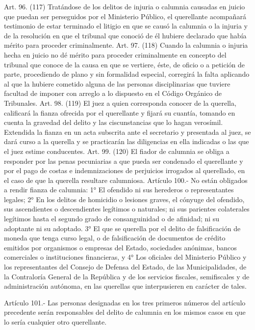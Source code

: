     Art. 96. (117) Tratándose de los delitos de injuria o calumnia causadas en juicio que puedan ser perseguidos por el Ministerio Público, el querellante acompañará testimonio de estar terminado el litigio en que se causó la calumnia o la injuria y de la resolución en que el tribunal que conoció de él hubiere declarado que había mérito para proceder criminalmente.
    Art. 97. (118) Cuando la calumnia o injuria hecha en juicio no dé mérito para proceder criminalmente en concepto del tribunal que conoce de la causa en que se vertiere, éste, de oficio o a petición de parte, procediendo de plano y sin formalidad especial, corregirá la falta aplicando al que la hubiere cometido alguna de las personas disciplinarias que tuviere facultad de imponer con arreglo a lo dispuesto en el Código Orgánico de Tribunales.
    Art. 98. (119) El juez a quien corresponda conocer de la querella, calificará la fianza ofrecida por el querellante y fijará su cuantía, tomando en cuenta la gravedad del delito y las ciscunstancias que lo hagan verosímil.
    Extendida la fianza en un acta subscrita ante el secretario y presentada al juez, se dará curso a la querella y se practicarán las diligencias en ella indicadas o las que el juez estime conducentes.
    Art. 99. (120) El fiador de calumnia se obliga a responder por las penas pecuniarias a que pueda ser condenado el querellante y por el pago de costas e indemnizaciones de perjuicios irrogados al querellado, en el caso de que la querella resultare calumniosa.
    Artículo 100.- No están obligados a rendir fianza de calumnia:
    1° El ofendido ni sus herederos o representantes legales;
    2° En los delitos de homicidio o lesiones graves, el cónyuge del ofendido, sus ascendientes o descendientes legítimos o naturales; ni sus parientes colaterales legítimos hasta el segundo grado de consanguinidad o de afinidad; ni su adoptante ni su adoptado.
    3° El que se querella por el delito de falsificación de moneda que tenga curso legal, o de falsificación de documentos de crédito emitidos por organismos o empresas del Estado, sociedades anónimas, bancos comerciales o instituciones financieras, y
    4° Los oficiales del Ministerio Público y los representantes del Consejo de Defensa del Estado, de las Municipalidades, de la Contraloría General de la República y de los servicios fiscales, semifiscales y de administración autónoma, en las querellas que interpusieren en carácter de tales.

    Artículo 101.- Las personas designadas en los tres primeros números del artículo precedente serán responsables del delito de calumnia en los mismos casos en que lo sería cualquier otro querellante.

